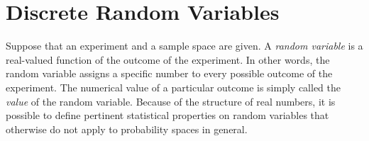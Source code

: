 \chapter{Discrete Random Variables}
\label{chapter:DiscreteRandomVariables}

Suppose that an experiment and a sample space are given.
A \emph{random variable} is a real-valued function of the outcome of the experiment. 
In other words, the random variable assigns a specific number to every possible outcome of the experiment.
The numerical value of a particular outcome is simply called the \emph{value} of the random variable. 
Because of the structure of real numbers, it is possible to define pertinent statistical properties on random variables that otherwise do not apply to probability spaces in general.

